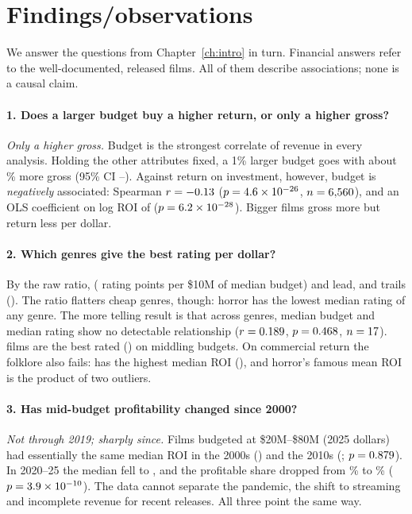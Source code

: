 \documentclass[a4paper,12pt]{report}
\begin{document}
\section{Findings/observations}

We answer the questions from Chapter~\ref{ch:intro} in turn. Financial answers refer to the \CleanUsableFinancialSample{} well-documented, released films. All of them describe associations; none is a causal claim.

\paragraph{1. Does a larger budget buy a higher return, or only a higher gross?} \emph{Only a higher gross.} Budget is the strongest correlate of revenue in every analysis. Holding the other attributes fixed, a 1\% larger budget goes with about \ModelOlsBudgetElasticity\% more gross (95\% CI \ModelOlsBudgetCiLo--\ModelOlsBudgetCiHi). Against return on investment, however, budget is \emph{negatively} associated: Spearman $r=-0.13$ ($p=4.6\times10^{-26}$, $n=6{,}560$), and an OLS coefficient on log ROI of \ModelRoiBudgetCoef{} ($p=6.2\times10^{-28}$). Bigger films gross more but return less per dollar.

\paragraph{2. Which genres give the best rating per dollar?} By the raw ratio, \MultiValueTopGenre{} (\MultiValueTopRatio{} rating points per \$10M of median budget) and \MultiValueSecondGenre{} lead, and \MultiValueBottomGenre{} trails (\MultiValueBottomRatio). The ratio flatters cheap genres, though: horror has the lowest median rating of any genre. The more telling result is that across genres, median budget and median rating show no detectable relationship ($r=0.189$, $p=0.468$, $n=17$). \MultiValueTopRatingGenre{} films are the best rated (\MultiValueTopRating) on middling budgets. On commercial return the folklore also fails: \MultiGenreTopMedianRoi{} has the highest median ROI (\MultiGenreTopMedianRoiValue), and horror's famous mean ROI is the product of two outliers.

\paragraph{3. Has mid-budget profitability changed since 2000?} \emph{Not through 2019; sharply since.} Films budgeted at \$20M--\$80M (2025 dollars) had essentially the same median ROI in the 2000s (\MultiMidRoiTwoZeroZeroZeros) and the 2010s (\MultiMidRoiTwoZeroOneZeros; $p=0.879$). In 2020--25 the median fell to \MultiMidRoiTwoZeroTwoZeros, and the profitable share dropped from \MultiMidPctProfTwoZeroOneZeros\% to \MultiMidPctProfTwoZeroTwoZeros\% ($p=3.9\times10^{-10}$). The data cannot separate the pandemic, the shift to streaming and incomplete revenue for recent releases. All three point the same way.
\end{document}
